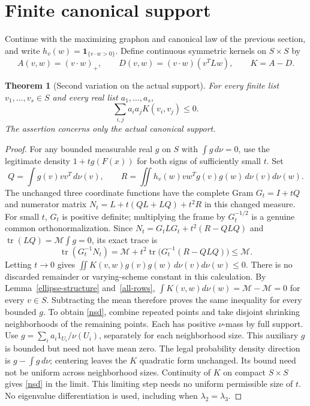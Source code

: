 \documentclass[11pt]{article}
\newtheorem{theorem}{Theorem}[section]
\theoremstyle{remark}\newtheorem{remark}[theorem]{Remark}
\DeclareMathOperator{\tr}{tr}
\numberwithin{equation}{section}
\begin{document}
\section{Finite canonical support}\label{sec-finite}
Continue with the maximizing graphon and canonical law of the previous
section, and write $h_v(w)=\mathbf1_{\{v\cdot w>0\}}$. Define continuous symmetric kernels on $S\times S$ by
\[
 A(v,w)=(v\cdot w)_+,\qquad
 D(v,w)=(v\cdot w)(v^TLw),\qquad K=A-D.
\]
\begin{theorem}[Second variation on the actual support]\label{negative}
For every finite list $v_1,\ldots,v_s\in S$ and every real list $a_1,\ldots,a_s$,
\begin{equation}
 \sum_{i,j}a_i a_j K(v_i,v_j)\le0. \label{nsd}
\end{equation}
The assertion concerns only the actual canonical support.
\end{theorem}
\begin{proof}
For any bounded measurable real $g$ on $S$ with $\int g\,d\nu=0$, use the legitimate density
$1+tg(F(x))$ for both signs of sufficiently small $t$.
Set
\[
 Q=\int g(v)vv^T\,d\nu(v),\qquad
 R=\iint h_v(w)vw^Tg(v)g(w)\,d\nu(v)d\nu(w).
\]
The unchanged three coordinate functions have the complete Gram $G_t=I+tQ$
and numerator matrix $N_t=L+t(QL+LQ)+t^2R$ in this changed measure.
For small $t$, $G_t$ is positive definite; multiplying the frame by $G_t^{-1/2}$
is a genuine common orthonormalization. Since
$N_t=G_tLG_t+t^2(R-QLQ)$ and $\tr(LQ)=\mathcal M\int g=0$, its exact trace is
\begin{equation}
 \tr(G_t^{-1}N_t)=\mathcal M+t^2\tr\bigl(G_t^{-1}(R-QLQ)\bigr)\le \mathcal M. \label{density}
\end{equation}
Letting $t\to0$ gives $\iint K(v,w)g(v)g(w)\,d\nu(v)d\nu(w)\le0$.
There is no discarded remainder or varying-scheme constant in this calculation.
By Lemma~\ref{ellipse-structure} and~\eqref{all-rows}, $\int K(v,w)d\nu(w)=\mathcal M-\mathcal M=0$ for every $v\in S$.
Subtracting the mean therefore proves the same inequality for every bounded $g$.
To obtain \eqref{nsd}, combine repeated points and take disjoint shrinking
neighborhoods of the remaining points. Each has positive $\nu$-mass by full support.
Use $g=\sum_i a_i1_{U_i}/\nu(U_i)$, separately for each neighborhood size.
This auxiliary $g$ is bounded but need not have mean zero. The legal probability
density direction is $g-\int g\,d\nu$; centering leaves the $K$ quadratic form unchanged.
Its bound need not be uniform across neighborhood sizes.
Continuity of $K$ on compact $S\times S$ gives \eqref{nsd} in the limit.
This limiting step needs no uniform permissible size of $t$.
No eigenvalue differentiation is used, including when $\lambda_2=\lambda_3$.
\end{proof}
\end{document}
